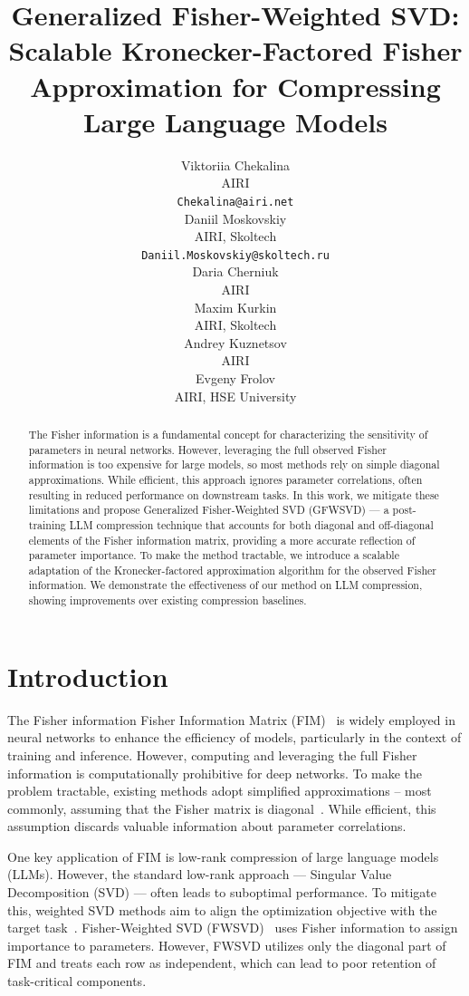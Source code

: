 \documentclass{article}
\title{Generalized Fisher-Weighted SVD: Scalable Kronecker-Factored Fisher Approximation for Compressing Large Language Models}
\author{%
  Viktoriia Chekalina \\
  AIRI\\
  \texttt{Chekalina@airi.net} \\
   \And
    Daniil Moskovskiy \\
   AIRI, Skoltech \\
   \texttt{Daniil.Moskovskiy@skoltech.ru} \\
   \AND
   Daria Cherniuk\\
   AIRI \\
   \And
   Maxim Kurkin \\
   AIRI, Skoltech \\
   \And
   Andrey Kuznetsov \\
   AIRI \\
   \And
   Evgeny Frolov \\
   AIRI, HSE University\\
}
\begin{document}
\maketitle


\begin{abstract}


The Fisher information is a fundamental concept for characterizing the sensitivity of parameters in neural networks. However, leveraging the full observed Fisher information is too expensive for large models, so most methods rely on simple diagonal approximations. While efficient, this approach ignores parameter correlations, often resulting in reduced performance on downstream tasks. In this work, we mitigate these limitations  and propose Generalized Fisher-Weighted SVD (GFWSVD) — a post-training LLM compression technique that accounts for both diagonal and off-diagonal elements of the Fisher information matrix, providing a more accurate reflection of parameter importance. To make the method tractable, we introduce a scalable adaptation of the Kronecker-factored approximation algorithm for the observed Fisher information. We demonstrate the effectiveness of our method on LLM compression, showing improvements over existing compression baselines.

\end{abstract}


\section{Introduction}

The Fisher information Fisher Information Matrix (FIM)~\cite{Fisher1992} is widely employed in neural networks to enhance the efficiency of models, particularly in the context of training and inference. However, computing and leveraging the full Fisher information is computationally prohibitive for deep networks. To make the problem tractable, existing methods adopt simplified approximations -- most commonly, assuming that the Fisher matrix is diagonal~\cite{wu2024improved, frankle2019lottery, soen2024tradeoffs}. While efficient, this assumption discards valuable information about parameter correlations.

One key application of FIM is low-rank compression of large language models (LLMs). However, the standard low-rank approach — Singular Value Decomposition (SVD) — often leads to suboptimal performance. To mitigate this, weighted SVD methods aim to align the optimization objective with the target task~\cite{asvd, FWSVD}. Fisher-Weighted SVD (FWSVD)~\cite{FWSVD} uses Fisher information to assign importance to parameters. However, FWSVD utilizes only the diagonal part of FIM and treats each row as independent, which can lead to poor retention of task-critical components.
\end{document}
